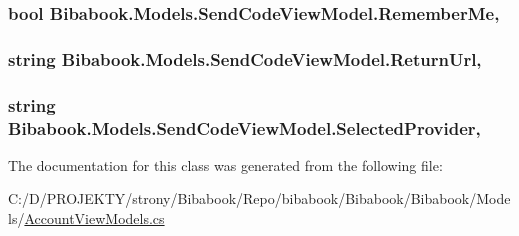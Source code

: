 \subsubsection[{Remember\+Me}]{\setlength{\rightskip}{0pt plus 5cm}bool Bibabook.\+Models.\+Send\+Code\+View\+Model.\+Remember\+Me\hspace{0.3cm}{\ttfamily [get]}, {\ttfamily [set]}}\label{class_bibabook_1_1_models_1_1_send_code_view_model_a5a33496836395989dd4f39fb2fcbe03c}
\hypertarget{class_bibabook_1_1_models_1_1_send_code_view_model_ac32ec2ef86de91769c2dd847ffee0136}{}
\subsubsection[{Return\+Url}]{\setlength{\rightskip}{0pt plus 5cm}string Bibabook.\+Models.\+Send\+Code\+View\+Model.\+Return\+Url\hspace{0.3cm}{\ttfamily [get]}, {\ttfamily [set]}}\label{class_bibabook_1_1_models_1_1_send_code_view_model_ac32ec2ef86de91769c2dd847ffee0136}
\hypertarget{class_bibabook_1_1_models_1_1_send_code_view_model_a7cd0f9f7fdf8c6c2d6629fa1b79c49ea}{}
\subsubsection[{Selected\+Provider}]{\setlength{\rightskip}{0pt plus 5cm}string Bibabook.\+Models.\+Send\+Code\+View\+Model.\+Selected\+Provider\hspace{0.3cm}{\ttfamily [get]}, {\ttfamily [set]}}\label{class_bibabook_1_1_models_1_1_send_code_view_model_a7cd0f9f7fdf8c6c2d6629fa1b79c49ea}


The documentation for this class was generated from the following file\+:\begin{DoxyCompactItemize}
\item 
C\+:/\+D/\+P\+R\+O\+J\+E\+K\+T\+Y/strony/\+Bibabook/\+Repo/bibabook/\+Bibabook/\+Bibabook/\+Models/\hyperlink{_account_view_models_8cs}{Account\+View\+Models.\+cs}\end{DoxyCompactItemize}
